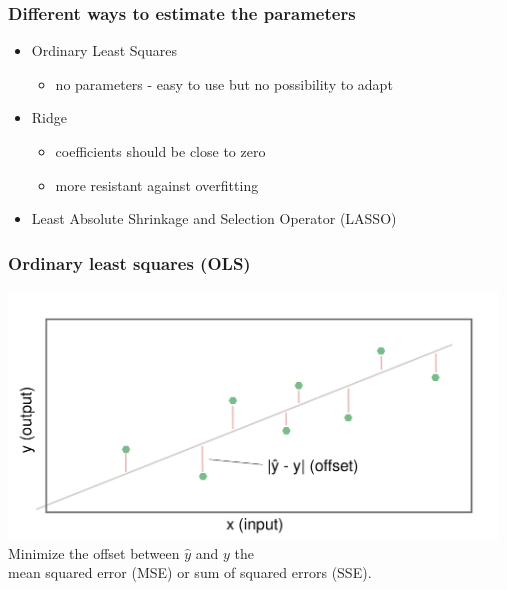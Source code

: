 \documentclass[aspectratio=169]{beamer}
\begin{document}
\begin{frame}
  \frametitle{Different ways to estimate the parameters}
  \begin{block}{}
    \begin{center}
      \begin{itemize}
      \item Ordinary Least Squares
        \begin{itemize}
        \item no parameters - easy to use but no possibility to adapt
        \end{itemize}
      \item Ridge
        \begin{itemize}
        \item coefficients should be close to zero
        \item more resistant against overfitting
        \end{itemize}    
      \item Least Absolute Shrinkage and Selection Operator (LASSO)
      \end{itemize}
    \end{center}
  \end{block}
\end{frame}

\begin{frame}
  \frametitle{Ordinary least squares (OLS)}
  \begin{center}
    \includegraphics[width=13.0cm]{images/linear_model_ordinary_least_squares.pdf}
    Minimize the offset between $\hat{y}$ and $y$ the\\
    mean squared error (MSE) or sum of squared errors (SSE).
  \end{center}
\end{frame}
\end{document}
